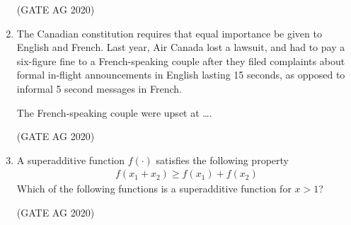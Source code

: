\documentclass[journal]{IEEEtran}
\begin{document}
\begin{enumerate}
\begin{enumerate}
\end{enumerate}
\hfill(GATE AG 2020)\\

\medskip

\item 
The Canadian constitution requires that equal importance be given to English and French. Last year, Air Canada lost a lawsuit, and had to pay a six-figure fine to a French-speaking couple after they filed complaints about formal in-flight announcements in English lasting 15 seconds, as opposed to informal 5 second messages in French.

The French-speaking couple were upset at \dots.

\begin{enumerate}
\end{enumerate}
\hfill(GATE AG 2020)\\

\medskip

\item 
A superadditive function $f(\cdot)$ satisfies the following property
\begin{align*}
f(x_1 + x_2) \geq f(x_1) + f(x_2)
\end{align*}
Which of the following functions is a superadditive function for $x > 1$?
\begin{enumerate}
\end{enumerate}
\hfill(GATE AG 2020)\\


\end{enumerate}
\end{document}

